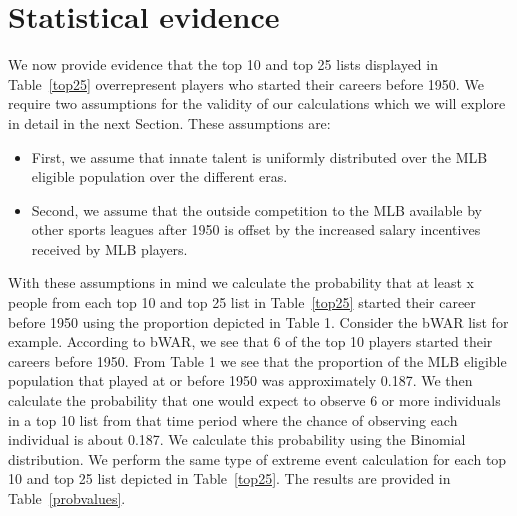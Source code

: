 \documentclass[11pt]{article}\usepackage[]{graphicx}\usepackage[]{color}
\begin{document}
\section{Statistical evidence}
\label{sec:Stats}

We now provide evidence that the top 10 and top 25 lists displayed in 
Table~\ref{top25} overrepresent players who started their careers 
before 1950.  
We require two assumptions for the validity of our calculations which we will 
explore in detail in the next Section. 
These assumptions are: 
\begin{itemize}
\item First, we assume that innate talent is uniformly distributed over the 
  MLB eligible population over the different eras.
\item Second, we assume that the outside competition to the MLB available by 
  other sports leagues after 1950 is offset by the increased salary 
  incentives received by MLB players.
\end{itemize}

With these assumptions in mind we calculate the probability that at least x 
people from each top 10 and top 25 list in Table~\ref{top25} started their 
career before 1950 using the proportion depicted in Table 1.  Consider the 
bWAR list for example.  According to bWAR, we see that 6 of the top 10 
players started their careers before 1950.  From Table 1 we see that the 
proportion of the MLB eligible population that played at or  
before 1950 was approximately 0.187.  
We then calculate the probability that one would expect to observe 6 or more 
individuals in a top 10 list from that time period where the chance of 
observing each individual is about 0.187.  We calculate 
this probability using the Binomial distribution.  
We perform the same type of extreme event 
calculation for each top 10 and top 25 list depicted in Table~\ref{top25}.  
The results are provided in Table~\ref{probvalues}.
\end{document}
